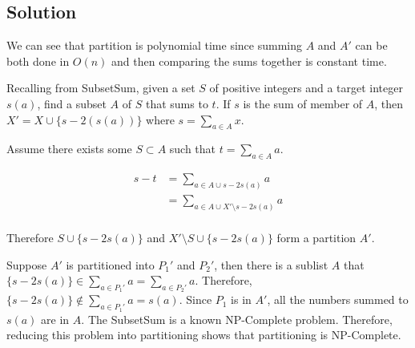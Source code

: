 \subsection*{Solution}

We can see that partition is polynomial time since summing $A$ and $A'$ can be both done in $O(n)$ and then comparing the sums together is constant time.

Recalling from SubsetSum, given a set $S$ of positive integers and a target integer $s(a)$, find a subset $A$ of $S$ that sums to $t$. If $s$ is the sum of member of $A$, then $X'=X \cup \{s - 2(s(a))\}$ where $s = \sum_{a \in A} x$.

Assume there exists some $S \subset A$ such that $t = \sum_{a \in A} a$.

\begin{align*}
  s - t &= \sum_{a \in A \cup {s-2s(a)}} a \\
        &= \sum_{a \in A \cup X' \setminus {s-2s(a)}} a \\
\end{align*}

Therefore $S \cup \{s - 2s(a)\}$ and $X' \setminus S \cup \{s - 2s(a)\}$ form a partition $A'$.

Suppose $A'$ is partitioned into $P_1'$ and $P_2'$, then there is a sublist $A$ that $\{s-2s(a)\} \in \sum_{a \in P_1'} a = \sum_{a \in P_2'} a$. Therefore, $\{s-2s(a)\} \notin \sum_{a \in P_1'} a = s(a)$. Since $P_1$ is in $A'$, all the numbers summed to $s(a)$ are in $A$. The SubsetSum is a known NP-Complete problem. Therefore, reducing this problem into partitioning shows that partitioning is NP-Complete.
